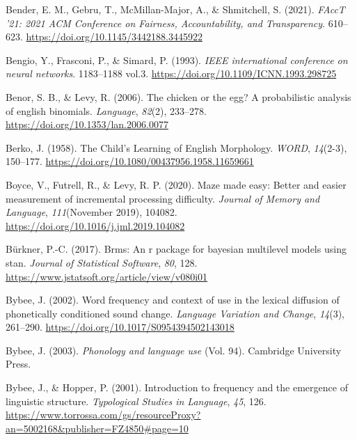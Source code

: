 \documentclass[
  12pt,
  letterpaper,
]{scrreprt}
\newlength{\cslhangindent}
\newenvironment{CSLReferences}[2] %
 {\begin{list}{}{%
  \setlength{\itemindent}{0pt}
  \setlength{\leftmargin}{0pt}
  \setlength{\parsep}{0pt}
  \ifodd #1
   \setlength{\leftmargin}{\cslhangindent}
   \setlength{\itemindent}{-1\cslhangindent}
  \fi
  \setlength{\itemsep}{#2\baselineskip}}}
 {\end{list}}
\begin{document}
\begin{CSLReferences}{1}{0}
Bender, E. M., Gebru, T., McMillan-Major, A., \& Shmitchell, S. (2021).
\emph{FAccT '21: 2021 ACM Conference on Fairness, Accountability, and
Transparency}. 610--623. \url{https://doi.org/10.1145/3442188.3445922}

Bengio, Y., Frasconi, P., \& Simard, P. (1993). \emph{IEEE international
conference on neural networks}. 1183--1188 vol.3.
\url{https://doi.org/10.1109/ICNN.1993.298725}

Benor, S. B., \& Levy, R. (2006). The chicken or the egg? A
probabilistic analysis of english binomials. \emph{Language},
\emph{82}(2), 233--278. \url{https://doi.org/10.1353/lan.2006.0077}

Berko, J. (1958). The Child's Learning of English Morphology.
\emph{{\emph{WORD}}}, \emph{14}(2-3), 150--177.
\url{https://doi.org/10.1080/00437956.1958.11659661}

Boyce, V., Futrell, R., \& Levy, R. P. (2020). Maze made easy: Better
and easier measurement of incremental processing difficulty.
\emph{Journal of Memory and Language}, \emph{111}(November 2019),
104082. \url{https://doi.org/10.1016/j.jml.2019.104082}

Bürkner, P.-C. (2017). Brms: An r package for bayesian multilevel models
using stan. \emph{Journal of Statistical Software}, \emph{80}, 128.
\url{https://www.jstatsoft.org/article/view/v080i01}

Bybee, J. (2002). Word frequency and context of use in the lexical
diffusion of phonetically conditioned sound change. \emph{Language
Variation and Change}, \emph{14}(3), 261--290.
\url{https://doi.org/10.1017/S0954394502143018}

Bybee, J. (2003). \emph{Phonology and language use} (Vol. 94). Cambridge
University Press.

Bybee, J., \& Hopper, P. (2001). Introduction to frequency and the
emergence of linguistic structure. \emph{Typological Studies in
Language}, \emph{45}, 126.
\url{https://www.torrossa.com/gs/resourceProxy?an=5002168&publisher=FZ4850\#page=10}


\end{CSLReferences}
\end{document}
